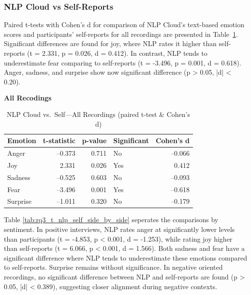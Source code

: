 \subsubsection{NLP Cloud vs Self-Reports}
Paired t-tests with Cohen's d for comparison of NLP Cloud's text-based emotion scores and participants' self-reports for all recordings are presented in Table~\ref{tab:rq3_t_nlp_self_all}. 
Significant differences are found for joy, where NLP rates it higher than self-reports (t = 2.331, p = 0.026, d = 0.412). In contrast, NLP tends to underestimate fear comparing to self-reports (t = -3.496, p = 0.001, d = 0.618). 
Anger, sadness, and surprise show now significant difference (p > 0.05, |d| < 0.20).  
\begin{table}[H]
    \centering
    \caption*{\textbf{All Recodings}}
    \begin{tabular}{l r r l r}
      \toprule
      \textbf{Emotion} & \textbf{t-statistic} & \textbf{p-value} & \textbf{Significant} & \textbf{Cohen’s d} \\
      \midrule
      Anger    & –0.373 & 0.711 & No  & –0.066 \\
      Joy      &  2.331 & 0.026 & Yes &  0.412 \\
      Sadness  & –0.525 & 0.603 & No  & –0.093 \\
      Fear     & –3.496 & 0.001 & Yes & –0.618 \\
      Surprise & –1.011 & 0.320 & No  & –0.179 \\
      \bottomrule
    \end{tabular}
    \caption{NLP Cloud vs.\ Self—All Recordings (paired t-test \& Cohen’s d)}
    \label{tab:rq3_t_nlp_self_all}
  \end{table}
  
Table \ref{tab:rq3_t_nlp_self_side_by_side} seperates the comparisons by sentiment. In positive interviews, NLP rates anger at significantly lower levels than participants (t = -4.853, p < 0.001, d = -1.253), while rating 
joy higher than self-reports (t = 6.066, p < 0.001, d = 1.566). Both sadness and fear have a significant difference where NLP tends to underestimate these emotions compared to self-reports. Surprise remains without significance. 
In negative oriented recordings, no significant difference between NLP and self-reports are found (p > 0.05, |d| < 0.389), suggesting closer alignment during negative contexts. 

